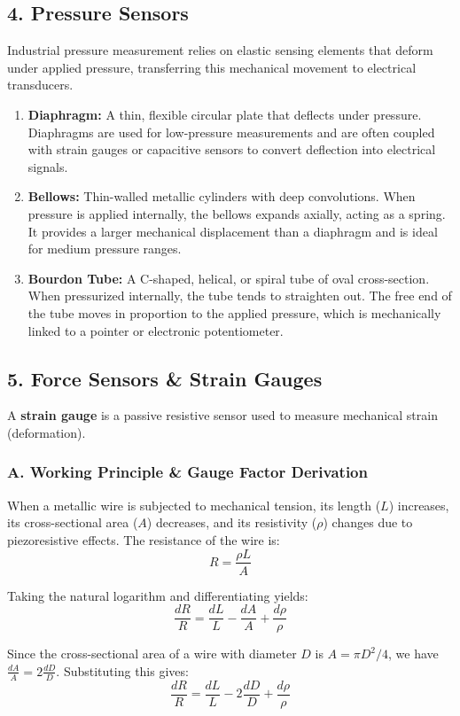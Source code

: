 \subsection{4. Pressure Sensors}
Industrial pressure measurement relies on elastic sensing elements that deform under applied pressure, transferring this mechanical movement to electrical transducers.

\begin{enumerate}
  \item \textbf{Diaphragm:} A thin, flexible circular plate that deflects under pressure. Diaphragms are used for low-pressure measurements and are often coupled with strain gauges or capacitive sensors to convert deflection into electrical signals.
  \item \textbf{Bellows:} Thin-walled metallic cylinders with deep convolutions. When pressure is applied internally, the bellows expands axially, acting as a spring. It provides a larger mechanical displacement than a diaphragm and is ideal for medium pressure ranges.
  \item \textbf{Bourdon Tube:} A C-shaped, helical, or spiral tube of oval cross-section. When pressurized internally, the tube tends to straighten out. The free end of the tube moves in proportion to the applied pressure, which is mechanically linked to a pointer or electronic potentiometer.
\end{enumerate}


\subsection{5. Force Sensors \& Strain Gauges}
A \textbf{strain gauge} is a passive resistive sensor used to measure mechanical strain (deformation).

\subsubsection{A. Working Principle \& Gauge Factor Derivation}
When a metallic wire is subjected to mechanical tension, its length ($L$) increases, its cross-sectional area ($A$) decreases, and its resistivity ($\rho$) changes due to piezoresistive effects. The resistance of the wire is:
\[ R = \frac{\rho L}{A} \]

Taking the natural logarithm and differentiating yields:
\[ \frac{dR}{R} = \frac{dL}{L} - \frac{dA}{A} + \frac{d\rho}{\rho} \]

Since the cross-sectional area of a wire with diameter $D$ is $A = \pi D^2 / 4$, we have $\frac{dA}{A} = 2 \frac{dD}{D}$. Substituting this gives:
\[ \frac{dR}{R} = \frac{dL}{L} - 2\frac{dD}{D} + \frac{d\rho}{\rho} \]

